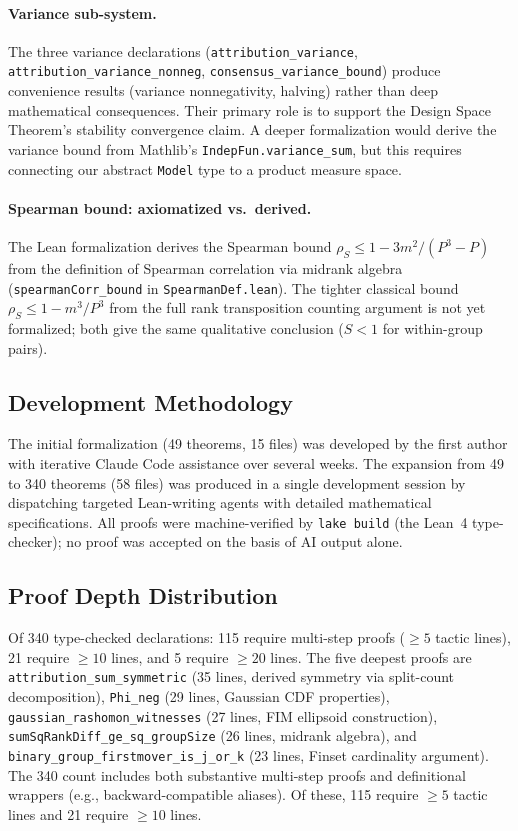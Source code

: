 \documentclass{article}
\begin{document}
\paragraph{Variance sub-system.}
\begin{sloppypar}
The three variance declarations (\texttt{attribution\allowbreak\_variance},
\texttt{attribution\allowbreak\_variance\allowbreak\_nonneg},
\texttt{consensus\allowbreak\_variance\allowbreak\_bound}) produce convenience results
(variance nonnegativity, halving) rather than deep mathematical consequences. Their
primary role is to support the Design Space Theorem's stability convergence claim.
A deeper formalization would derive the variance bound from Mathlib's
\texttt{IndepFun.variance\_sum}, but this requires connecting our abstract
\texttt{Model} type to a product measure space.
\end{sloppypar}

\paragraph{Spearman bound: axiomatized vs.\ derived.}
The Lean formalization derives the Spearman bound $\rho_S \leq 1 - 3m^2/(P^3{-}P)$ from the definition of Spearman correlation via midrank algebra (\texttt{spearmanCorr\_bound} in \texttt{SpearmanDef.lean}). The tighter classical bound $\rho_S \leq 1 - m^3/P^3$ from the full rank transposition counting argument is not yet formalized; both give the same qualitative conclusion ($S < 1$ for within-group pairs).

\subsection{Development Methodology}

The initial formalization (49 theorems, 15 files) was developed by the first author with iterative Claude Code assistance over several weeks. The expansion from 49 to 340 theorems (58 files) was produced in a single development session by dispatching targeted Lean-writing agents with detailed mathematical specifications. All proofs were machine-verified by \texttt{lake build} (the Lean~4 type-checker); no proof was accepted on the basis of AI output alone.

\subsection{Proof Depth Distribution}

Of 340 type-checked declarations: 115 require multi-step proofs (${\geq}5$ tactic lines), 21 require ${\geq}10$ lines, and 5 require ${\geq}20$ lines. The five deepest proofs are \texttt{attribution\_sum\_symmetric} (35 lines, derived symmetry via split-count decomposition), \texttt{Phi\_neg} (29 lines, Gaussian CDF properties), \texttt{gaussian\_rashomon\_witnesses} (27 lines, FIM ellipsoid construction), \texttt{sumSqRankDiff\_ge\_sq\_groupSize} (26 lines, midrank algebra), and \texttt{binary\_group\_firstmover\_is\_j\_or\_k} (23 lines, Finset cardinality argument).
The 340 count includes both substantive multi-step proofs and definitional wrappers (e.g., backward-compatible aliases). Of these, 115 require ${\geq}5$ tactic lines and 21 require ${\geq}10$ lines.
\end{document}
